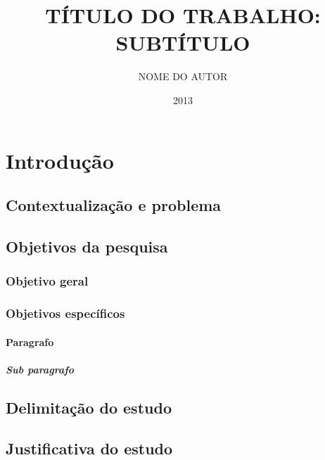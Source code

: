 \documentclass{tccbsi}
\title{TÍTULO DO TRABALHO: SUBTÍTULO}
\author{NOME DO AUTOR}
\date{2013}
\begin{document}
\section{Introdução}

\lipsum[1-3]

\subsection{Contextualização e problema}

\lipsum[1-3]

\subsection{Objetivos da pesquisa}

\lipsum[1-3]

    \subsubsection{Objetivo geral}

    \lipsum[1-3]

    \subsubsection{Objetivos específicos}

    \lipsum[1-4]

        \paragraph{Paragrafo}

        \lipsum[1-3]

            \subparagraph{Sub paragrafo}

            \lipsum[1-3]

\subsection{Delimitação do estudo}

\lipsum[1-3]

\subsection{Justificativa do estudo}

\lipsum[1-3]
\end{document}
